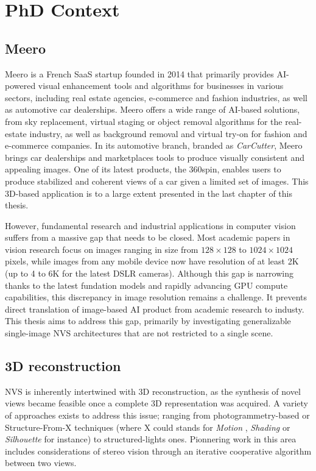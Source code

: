 \section{PhD Context}

\subsection{Meero}
Meero is a French \ac{SaaS} startup founded in 2014 that primarily provides \ac{AI}-powered visual enhancement tools and algorithms for businesses in various sectors, including real estate agencies, e-commerce and fashion industries, as well as automotive car dealerships. Meero offers a wide range of \ac{AI}-based solutions, from sky replacement, virtual staging or object removal algorithms for the real-estate industry, as well as background removal and virtual try-on for fashion and e-commerce companies. In its automotive branch, branded as \textit{CarCutter}, Meero brings car dealerships and marketplaces tools to produce visually consistent and appealing images. One of its latest products, the 360\degree spin, enables users to produce stabilized and coherent views of a car given a limited set of images. This 3D-based application is to a large extent presented in the last chapter of this thesis.

However, fundamental research and industrial applications in computer vision suffers from a massive gap that needs to be closed. Most academic papers in vision research focus on images ranging in size from $128\times128$ to $1024\times1024$ pixels, while images from any mobile device now have resolution of at least 2K (up to 4 to 6K for the latest \ac{DSLR} cameras). Although this gap is narrowing thanks to the latest fundation models and rapidly advancing \ac{GPU} compute capabilities, this discrepancy in image resolution remains a challenge. It prevents direct translation of image-based \ac{AI} product from academic research to industy. This thesis aims to address this gap, primarily by investigating generalizable single-image \ac{NVS} architectures that are not restricted to a single scene. 

\subsection{3D reconstruction}
 \ac{NVS} is inherently intertwined with 3D reconstruction, as the synthesis of novel views became feasible once a complete 3D representation was acquired. A variety of approaches exists to address this issue; ranging from photogrammetry-based or Structure-From-X techniques (where X could stands for \textit{Motion} \citep{longuet1981computer}, \textit{Shading} \citep{horn1989obtaining} or \textit{Silhouette} \citep{baumgart1974geometric} for instance) to structured-lights ones. Pionnering work in this area includes considerations of stereo vision \citep{marr1976cooperative} through an iterative cooperative algorithm between two views. 
 
